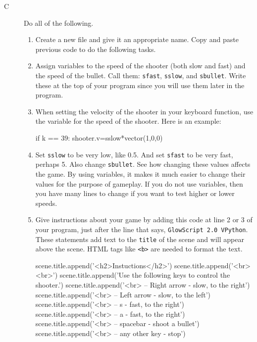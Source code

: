 \pagebreak

\analysis

\begin{description}

\item[C] Do all of the following.
\begin{enumerate}
	\item Create a new file and give it an appropriate name. Copy and paste previous code to do the following tasks.
	\item Assign variables to the speed of the shooter (both slow and fast) and the speed of the bullet. Call them: \texttt{sfast}, \texttt{sslow}, and \texttt{sbullet}. Write these at the top of your program since you will use them later in the program.
	\item When setting the velocity of the shooter in your keyboard function, use the variable for the speed of the shooter. Here is an example:
	
\begin{myvpython}
        if k == 39:
            shooter.v=sslow*vector(1,0,0)
\end{myvpython}

	\item Set \texttt{sslow} to be very low, like 0.5. And set \texttt{sfast} to be very fast, perhaps 5. Also change \texttt{sbullet}. See how changing these values affects the game. By using variables, it makes it much easier to change their values for the purpose of gameplay. If you do not use variables, then you have many lines to change if you want to test higher or lower speeds.
	\item Give instructions about your game by adding this code at line 2 or 3 of your program, just after the line that says, \texttt{GlowScript 2.0 VPython}.  These statements add text to the \texttt{title} of the scene and will appear above the scene. HTML tags like \texttt{<b>} are needed to format the text.
	
\begin{myvpython}
scene.title.append('<h2>Instuctions</h2>')
scene.title.append('<br><br>')
scene.title.append('Use the following keys to control the shooter.')
scene.title.append('<br> -- Right arrow - slow, to the right')
scene.title.append('<br> -- Left arrow - slow, to the left')
scene.title.append('<br> -- s - fast, to the right')
scene.title.append('<br> -- a - fast, to the right')
scene.title.append('<br> -- spacebar - shoot a bullet')
scene.title.append('<br> -- any other key - stop')
\end{myvpython}	



\end{enumerate}
\end{description}
